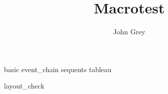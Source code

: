 \documentclass[12pt]{book}
\title{Macrotest}
\author{John Grey}
\begin{document}
\frontmatter
\maketitle
\tableofcontents

\mainmatter
\setlength{\parskip}{1.5em}

{basic}
{event_chain}
{sequents}
{tableau}

{layout_check}

\nocite{*}


\end{document}
